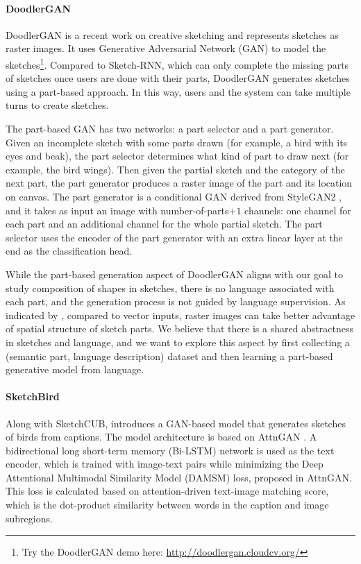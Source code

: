 \paragraph{DoodlerGAN} 
DoodlerGAN \citep{doodlerGAN} is a recent work on creative sketching and represents sketches as raster images. It uses Generative Adversarial Network (GAN) to model the sketches\footnote{Try the DoodlerGAN demo here: \url{http://doodlergan.cloudcv.org/}}. 
Compared to Sketch-RNN, which can only complete the missing parts of sketches once users are done with their parts, DoodlerGAN generates sketches using a part-based approach. In this way, users and the system can take multiple turns to create sketches. 

The part-based GAN has two networks: a part selector and a part generator. Given an incomplete sketch with some parts drawn (for example, a bird with its eyes and beak), the part selector determines what kind of part to draw next (for example, the bird wings). Then given the partial sketch and the category of the next part, the part generator produces a raster image of the part and its location on canvas. 
The part generator is a conditional GAN derived from StyleGAN2 \citep{styleGAN2Paper}, and it takes as input an image with number-of-parts$+1$ channels: one channel for each part and an additional channel for the whole partial sketch. The part selector uses the encoder of the part generator with an extra linear layer at the end as the classification head. 

While the part-based generation aspect of DoodlerGAN aligns with our goal to study composition of shapes in sketches, there is no language associated with each part, and the generation process is not guided by language supervision. As indicated by \cite{doodlerGAN}, compared to vector inputs, raster images can take better advantage of spatial structure of sketch parts. We believe that there is a shared abstractness in sketches and language, and we want to explore this aspect by first collecting a (semantic part, language description) dataset and then learning a part-based generative model from language.   

\paragraph{SketchBird}
Along with SketchCUB, \cite{sketchbirds} introduces a GAN-based model that generates sketches of birds from captions. The model architecture is based on AttnGAN \citep{attngan_paper}.
A bidirectional long short-term memory (Bi-LSTM) network is used as the text encoder, which is trained with image-text pairs while minimizing the Deep Attentional Multimodal Similarity Model (DAMSM) loss, proposed in AttnGAN. 
This loss is calculated based on attention-driven text-image matching score, which is the dot-product similarity between words in the caption and image subregions. 

